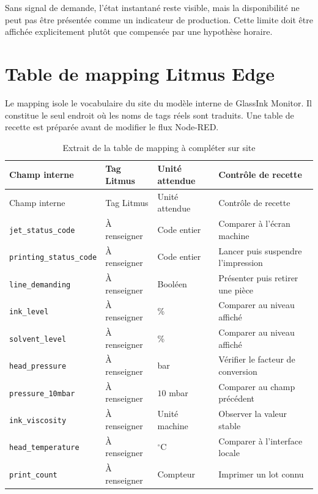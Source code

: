 Sans signal de demande, l'état instantané reste visible, mais la disponibilité
ne peut pas être présentée comme un indicateur de production. Cette limite doit
être affichée explicitement plutôt que compensée par une hypothèse horaire.

\section{Table de mapping Litmus Edge}

Le mapping isole le vocabulaire du site du modèle interne de GlassInk Monitor.
Il constitue le seul endroit où les noms de tags réels sont traduits. Une table
de recette est préparée avant de modifier le flux Node-RED.

{\small
\renewcommand{\arraystretch}{1.45}
\begin{longtable}{p{}p{}p{}p{}}
\caption{Extrait de la table de mapping à compléter sur site}\\
\toprule
Champ interne & Tag Litmus & Unité attendue & Contrôle de recette \\
\midrule
\endfirsthead
\toprule
Champ interne & Tag Litmus & Unité attendue & Contrôle de recette \\
\midrule
\endhead
\nolinkurl{jet_status_code} & À renseigner & Code entier & Comparer à l'écran machine \\
\addlinespace[2pt]
\nolinkurl{printing_status_code} & À renseigner & Code entier & Lancer puis suspendre l'impression \\
\addlinespace[2pt]
\nolinkurl{line_demanding} & À renseigner & Booléen & Présenter puis retirer une pièce \\
\addlinespace[2pt]
\nolinkurl{ink_level} & À renseigner & \% & Comparer au niveau affiché \\
\addlinespace[2pt]
\nolinkurl{solvent_level} & À renseigner & \% & Comparer au niveau affiché \\
\addlinespace[2pt]
\nolinkurl{head_pressure} & À renseigner & bar & Vérifier le facteur de conversion \\
\addlinespace[2pt]
\nolinkurl{pressure_10mbar} & À renseigner & $10$ mbar & Comparer au champ précédent \\
\addlinespace[2pt]
\nolinkurl{ink_viscosity} & À renseigner & Unité machine & Observer la valeur stable \\
\addlinespace[2pt]
\nolinkurl{head_temperature} & À renseigner & $^{\circ}$C & Comparer à l'interface locale \\
\addlinespace[2pt]
\nolinkurl{print_count} & À renseigner & Compteur & Imprimer un lot connu \\
\bottomrule
\end{longtable}
}

